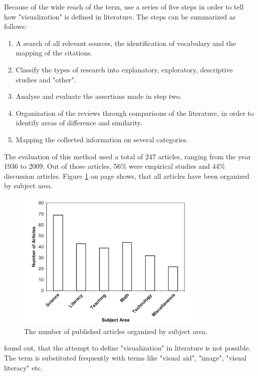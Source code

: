 Because of the wide reach of the term, \citeauthor{Phillips2010} use a series of five steps in order to tell how "visualization" is defined in literature. The steps can be summarized as follows:
\begin{enumerate}
\item A search of all relevant sources, the identification of vocabulary and the mapping of the citations.
\item Classify the types of research into explanatory, exploratory, descriptive studies and "other".
\item Analyse and evaluate the assertions made in step two.
\item Organization of the reviews through comparisons of the literature, in order to identify areas of difference and similarity.
\item Mapping the collected information on several categories.
\end{enumerate}
The evaluation of this method used a total of 247 articles, ranging from the year 1936 to 2009. Out of those articles, 56\% were empirical studies and 44\% discussion articles. Figure \ref{fig:evaluation-definition} on page \pageref{fig:evaluation-definition} shows, that all articles have been organized by subject area.

\begin{figure}[!htb]
\centering
\includegraphics[width=0.8\textwidth,keepaspectratio]{images/definition/evaluation-definition.png}
\caption[
    The number of published articles organized by subject area .
]{The number of published articles organized by subject area.}
\label{fig:evaluation-definition}
\end{figure}

\citeauthor{Phillips2010} found out, that the attempt to define "visualization" in literature is not possible. The term is substituted frequently with terms like "visual aid", "image", "visual literacy" etc.

